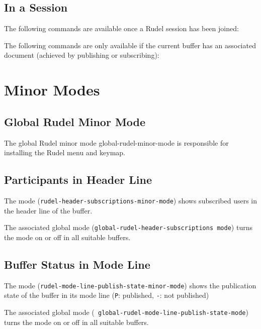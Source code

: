 
\subsection{In a Session}

The following commands are available once a Rudel session has been
joined:



The following commands are only available if the current buffer has an
associated document (achieved by publishing or subscribing):


\section{Minor Modes}

\subsection{Global Rudel Minor Mode}

The global Rudel minor mode global-rudel-minor-mode is responsible for
installing the Rudel menu and keymap.

\subsection{Participants in Header Line}

The mode ({\tt rudel-header-subscriptions-minor-mode}) shows
subscribed users in the header line of the buffer.

The associated global mode ({\tt global-rudel-header-subscriptions
mode}) turns the mode on or off in all suitable buffers.

\subsection{Buffer Status in Mode Line}

The mode ({\tt rudel-mode-line-publish-state-minor-mode}) shows the
publication state of the buffer in its mode line ({\tt P}: published,
{\tt -}: not published)

The associated global mode ({\tt
global-rudel-mode-line-publish-state-mode}) turns the mode on or off
in all suitable buffers.

